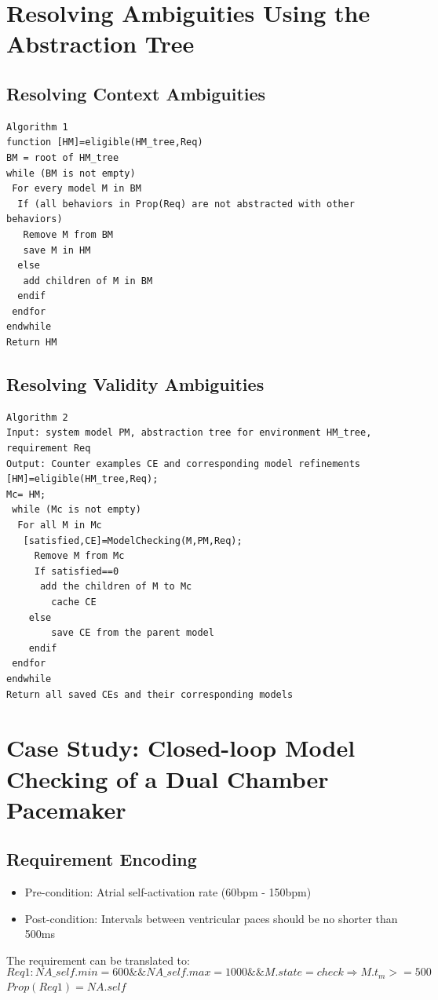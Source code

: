 \section{Resolving Ambiguities Using the Abstraction Tree}
\subsection{Resolving Context Ambiguities}
\begin{Verbatim}
Algorithm 1
function [HM]=eligible(HM_tree,Req)
BM = root of HM_tree
while (BM is not empty)
 For every model M in BM
  If (all behaviors in Prop(Req) are not abstracted with other behaviors)
   Remove M from BM
   save M in HM
  else
   add children of M in BM
  endif
 endfor
endwhile
Return HM
\end{Verbatim}
\subsection{Resolving Validity Ambiguities}

\begin{Verbatim}
Algorithm 2
Input: system model PM, abstraction tree for environment HM_tree, requirement Req
Output: Counter examples CE and corresponding model refinements
[HM]=eligible(HM_tree,Req);
Mc= HM;
 while (Mc is not empty)
  For all M in Mc
   [satisfied,CE]=ModelChecking(M,PM,Req);
	 Remove M from Mc
	 If satisfied==0
	  add the children of M to Mc
		cache CE
	else
		save CE from the parent model
	endif
 endfor
endwhile
Return all saved CEs and their corresponding models
\end{Verbatim}



\section{Case Study: Closed-loop Model Checking of a Dual Chamber Pacemaker}
\label{contextAmbiguities}
\subsection{Requirement Encoding}
\begin{itemize}
	\item Pre-condition: Atrial self-activation rate (60bpm - 150bpm)
    \item Post-condition: Intervals between ventricular paces should be no shorter than 500ms
\end{itemize}
The requirement can be translated to:
$$Req1: NA\_self.min=600 \&\& NA\_self.max=1000 \&\& M.state=check\Rightarrow M.t_m>=500$$
$Prop(Req1)=NA.self$
